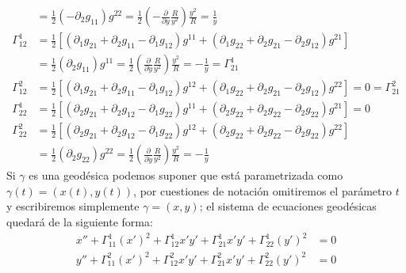 \begin{example}
\begin{align*}
		                & = \frac{1}{2}(-\partial_{2}g_{11})g^{22} = \frac{1}{2}\left(
		-\frac{\partial}{\partial y} \frac{R}{y^{2}}
		\right) \frac{y^2}{R} = \frac{1}{y}                                             \\
		\Gamma_{12}^{1} & = \frac{1}{2} \left[
		(\partial_{1}g_{21} + \partial_{2}g_{11} - \partial_{1}g_{12})g^{11}
		+ (\partial_{1}g_{22} + \partial_{2}g_{21} - \partial_{2}g_{12})g^{21}
		\right]                                                                         \\
		                & = \frac{1}{2} (\partial_{2}g_{11})g^{11} = \frac{1}{2} \left(
		\frac{\partial}{\partial y} \frac{R}{y^2} \right) \frac{y^2}{R}
		= - \frac{1}{y} =\Gamma_{21}^{1}                                                \\
		\Gamma_{12}^{2} & = \frac{1}{2} \left[
		(\partial_{1}g_{21} + \partial_{2}g_{11} - \partial_{1}g_{12})g^{12}
		+ (\partial_{1}g_{22} + \partial_{2}g_{21} - \partial_{2}g_{12})g^{22}
		\right] = 0 = \Gamma_{21}^{2}                                                   \\
		\Gamma_{22}^{1} & = \frac{1}{2} \left[
		(\partial_{2}g_{21} + \partial_{2}g_{12} - \partial_{1}g_{22})g^{11}
		+ (\partial_{2}g_{22} + \partial_{2}g_{22} - \partial_{2}g_{22})g^{21}
		\right] = 0                                                                     \\
		\Gamma_{22}^{2} & = \frac{1}{2} \left[
		(\partial_{2}g_{21} + \partial_{2}g_{12} - \partial_{1}g_{22})g^{12}
		+ (\partial_{2}g_{22} + \partial_{2}g_{22} - \partial_{2}g_{22})g^{22}
		\right]                                                                         \\
		                & = \frac{1}{2} (\partial_{2}g_{22})g^{22} = \frac{1}{2} \left(
		\frac{\partial}{\partial y} \frac{R}{y^2} \right) \frac{y^2}{R}
		= - \frac{1}{y}
	\end{align*}
	Si $\gamma$ es una geodésica podemos suponer que está parametrizada como $\gamma(t) = (x(t),y(t))$, por cuestiones de notación omitiremos el parámetro $t$ y escribiremos simplemente $\gamma = (x,y)$; el sistema de ecuaciones geodésicas quedará de la siguiente forma:
	\begin{align*}
		x'' + \Gamma_{11}^{1} (x')^2 + \Gamma_{12}^{1} x'y' + \Gamma_{21}^{1}x'y' + \Gamma_{22}^{1}(y')^{2} & = 0 \\
		y'' + \Gamma_{11}^{2} (x')^2 + \Gamma_{12}^{2} x'y' + \Gamma_{21}^{2}x'y' + \Gamma_{22}^{2}(y')^{2} & = 0
	\end{align*}

\end{example}
